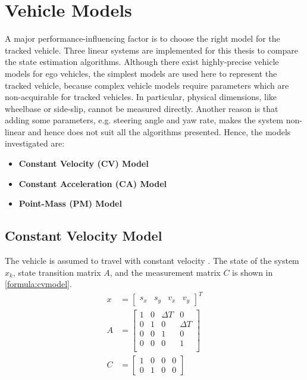 \section{Vehicle Models}
A major performance-influencing factor is to choose the right model for the tracked vehicle. Three linear systems are implemented for this thesis to compare the state estimation algorithms. Although there exist highly-precise vehicle models for ego vehicles, the simplest models are used here to represent the tracked vehicle, because complex vehicle models require parameters which are non-acquirable for tracked vehicles. In particular, physical dimensions, like wheelbase or side-slip, cannot be measured directly. Another reason is that adding some parameters, e.g. steering angle and yaw rate, makes the system non-linear and hence does not suit all the algorithms presented. Hence, the models investigated are:
\begin{itemize}
\item \textbf{Constant Velocity (CV) Model}
\item \textbf{Constant Acceleration (CA) Model}
\item \textbf{Point-Mass (PM) Model}
\end{itemize}

\subsection{Constant Velocity Model}
The vehicle is assumed to travel with constant velocity \cite{Schubert2008}. The state of the system $x_k$, state transition matrix $A$, and the measurement matrix $C$ is shown in \eqref{formula:cvmodel}.
\begin{equation}
\label{formula:cvmodel}
\begin{split}
x &=
\left[\begin{matrix}
s_x & s_y & v_x & v_y
\end{matrix}\right]^{T}\\
A&= \left[\begin{matrix}
1 & 0 & \Delta T & 0\\
0 & 1 & 0 & \Delta T\\
0 & 0 & 1 & 0\\
0 & 0 & 0 & 1\\
\end{matrix}\right]\\
C&= \left[\begin{matrix}
1 & 0 & 0 & 0\\
0 & 1 & 0 & 0
\end{matrix}\right]
\end{split}
\end{equation}

